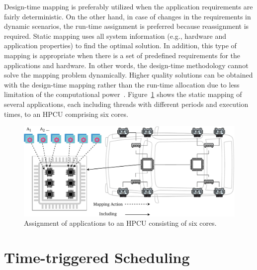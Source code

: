     Design-time mapping is preferably utilized when the application requirements are fairly deterministic. On the other hand, in case of changes in the requirements in dynamic scenarios, the run-time assignment is preferred because reassignment is required.
    Static mapping uses all system information (e.g., hardware and
    application properties) to find the optimal solution. In addition, this type of mapping is
    appropriate when there is a set of predefined requirements for the applications and hardware. In other words, the design-time methodology cannot solve the mapping problem dynamically. Higher quality solutions can be obtained with the design-time mapping rather than the run-time allocation due to less limitation of the computational power~\cite{askaripoor2022architecture, askaripoor2023designer}. Figure~\ref{fig21} shows the static mapping of several applications, each including threads with different periods and execution times, to an HPCU comprising six cores.



\begin{figure}[t]
\centering
\includegraphics[width=1\textwidth]{figures/mappingaction.pdf}
\caption{Assignment of applications to an HPCU consisting of six cores. }
\label{fig21}
\end{figure}


    \section{Time-triggered Scheduling}\label{TT_Sched}

